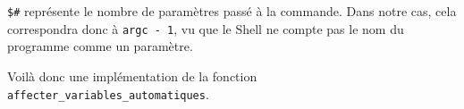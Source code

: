 \documentclass[10pt]{article}
\begin{document}
\begin{enumerate}[label=\textbf{[\alph*]}]
  \vspace{0.2cm}
  \texttt{\$\#} représente le nombre de paramètres passé à la
  commande. Dans notre cas, cela correspondra donc à
  \texttt{argc - 1}, vu que le Shell ne compte pas le nom du programme
  comme un paramètre.

  \vspace{0.2cm}
  Voilà donc une implémentation de la fonction
  \texttt{affecter\_variables\_automatiques}.

  



%
%
%  
%
%
%
%  
%

\end{enumerate}
\end{document}
